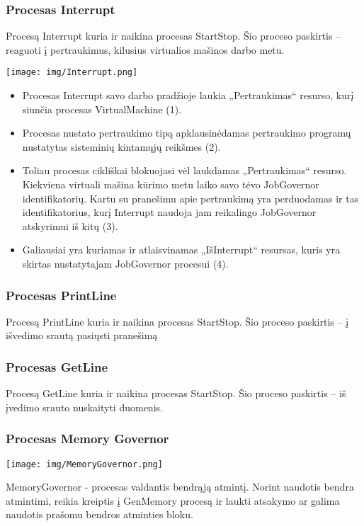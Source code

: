 \subsubsection{Procesas Interrupt}
Procesą Interrupt kuria ir naikina procesas StartStop. Šio proceso paskirtis – reaguoti į pertraukimus, kilusius virtualios mašinos darbo metu. 

\texttt{[image: img/Interrupt.png]}

	\begin{itemize}
		\item Procesas Interrupt savo darbo pradžioje laukia „Pertraukimas“ resurso, kurį siunčia procesas VirtualMachine (1).
		\item  Procesas nustato pertraukimo tipą apklausinėdamas pertraukimo programų nustatytas sisteminių kintamųjų reikšmes (2).
		\item Toliau procesas cikliškai blokuojasi vėl laukdamas „Pertraukimas“ resurso. Kiekviena virtuali mašina kūrimo metu laiko savo tėvo JobGovernor identifikatorių. Kartu su pranešimu apie pertraukimą yra perduodamas ir tas identifikatorius, kurį Interrupt naudoja jam reikalingo JobGovernor atskyrimui iš kitų (3).
		\item Galiausiai yra kuriamas ir atlaisvinamas „IšInterrupt“ resursas, kuris yra skirtas nustatytajam JobGovernor procesui (4). 
	\end{itemize}
\subsubsection{Procesas PrintLine}
Procesą PrintLine kuria ir naikina procesas StartStop. Šio proceso paskirtis – į išvedimo srautą pasiųsti pranešimą
	
\subsubsection{Procesas GetLine}
Procesą GetLine kuria ir naikina procesas StartStop. Šio proceso paskirtis – iš įvedimo srauto nuskaityti duomenis. 

\subsubsection{Procesas Memory Governor}

\texttt{[image: img/MemoryGovernor.png]}

MemoryGovernor - procesas valdantis bendrąją atmintį. Norint naudotis bendra atmintimi, reikia kreiptis į GenMemory procesą ir laukti atsakymo ar galima naudotis prašomu bendros atminties bloku.
